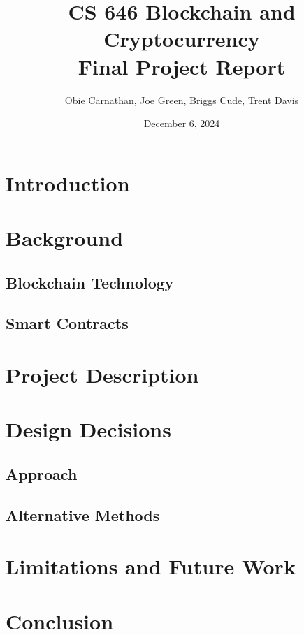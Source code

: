 \documentclass{article}
\begin{document}
\title{CS 646 Blockchain and Cryptocurrency \\
Final Project Report}
\author{Obie Carnathan, Joe Green, Briggs Cude, Trent Davis}
\date{December 6, 2024}
\maketitle

\section{Introduction}

\section{Background}
\subsection{Blockchain Technology}
\subsection{Smart Contracts}

\section{Project Description}

\section{Design Decisions}
\subsection{Approach}
\subsection{Alternative Methods}

\section{Limitations and Future Work}

\section{Conclusion}
\end{document}
